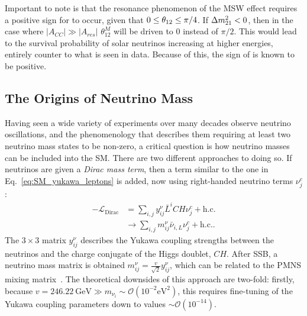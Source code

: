 \begin{figure}
    \centering
    \caption[]{}
    \label{fig:pee_solar_data}
\end{figure}

Important to note is that the resonance phenomenon of the MSW effect requires a positive sign for \dmsq{} to occur, given that $0\leq\theta_{12}{}\leq\pi/4$. If $\Delta m^{2}_{21}{}<0$, then in the case where $|A_{CC}|\gg |A_{res}|$ $\theta_{12}^{M}$ will be driven to 0 instead of $\pi/2$. This would lead to the survival probability of solar neutrinos increasing at higher energies, entirely counter to what is seen in data. Because of this, the sign of \dmsq{} is known to be positive.


\subsection{The Origins of Neutrino Mass}
Having seen a wide variety of experiments over many decades observe neutrino oscillations, and the phenomenology that describes them requiring at least two neutrino mass states to be non-zero, a critical question is how neutrino masses can be included into the SM. There are two different approaches to doing so. If neutrinos are given a \textit{Dirac mass term}, then a term similar to the one in Eq.~\ref{eq:SM_yukawa_leptons} is added, now using right-handed neutrino terms $\nu^{c}_{j}$:
\begin{align}
    -\mathcal{L}_{\mathrm{Dirac}} &= \sum_{i,j}y^{\nu}_{ij}\bar{L}^{i}CH\nu^{c}_{j} + \mathrm{ h.c.}\\
                              &\to \sum_{i,j}m^{\nu}_{ij}\bar{\nu}_{i,L}\nu^{c}_{j} + \mathrm{ h.c.}.
\end{align}
The $3\times3$ matrix $y^{\nu}_{ij}$ describes the Yukawa coupling strengths between the neutrinos and the charge conjugate of the Higgs doublet, $CH$. After SSB, a neutrino mass matrix is obtained $m^{\nu}_{ij} = \frac{v}{\sqrt{2}}y^{\nu}_{ij}$, which can be related to the PMNS mixing matrix~\cite{}. %
The theoretical downsides of this approach are two-fold: firstly, because $v = \SI{246.22}{\GeV} \gg m_{\nu_{i}}\sim \mathcal{O}(10^{-2}\si{\eV\squared})$, this requires fine-tuning of the Yukawa coupling parameters down to values $\sim\mathcal{O}(10^{-14})$.


